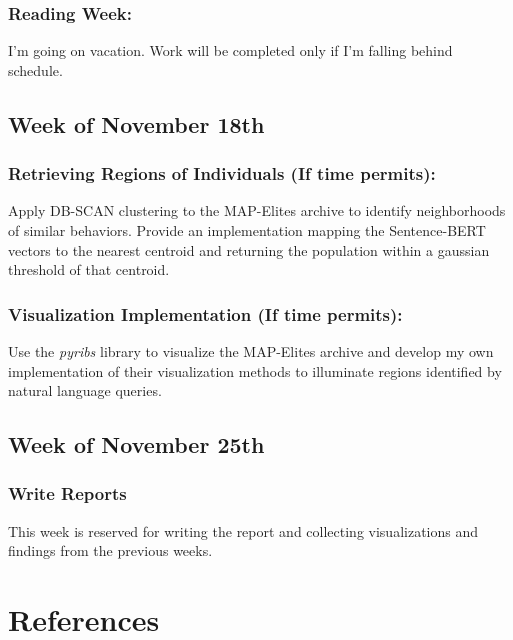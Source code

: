 \documentclass[11pt]{article}
\begin{document}
\subsubsection{Reading Week:}
\label{sec:org6e41b33}

I'm going on vacation. Work will be completed only if I'm falling behind schedule.

\subsection{Week of November 18th}
\label{sec:orgad7e614}

\subsubsection{Retrieving Regions of Individuals (If time permits):}
\label{sec:org10fd00e}

Apply DB-SCAN clustering to the MAP-Elites archive to identify neighborhoods of similar behaviors.
Provide an implementation mapping the Sentence-BERT vectors to the nearest centroid and returning
the population within a gaussian threshold of that centroid.

\subsubsection{Visualization Implementation (If time permits):}
\label{sec:org2e367b7}

Use the \emph{pyribs} library to visualize the MAP-Elites archive and develop my own implementation
of their visualization methods to illuminate regions identified by natural language queries.

\subsection{Week of November 25th}
\label{sec:org67bad73}

\subsubsection{Write Reports}
\label{sec:orgc92bf0d}

This week is reserved for writing the report and collecting visualizations and findings from the previous weeks.

\section{References}
\label{sec:org2671d5b}
\end{document}
